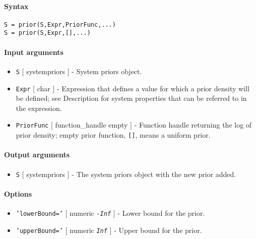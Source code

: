 


	\paragraph{Syntax}

\begin{verbatim}
S = prior(S,Expr,PriorFunc,...)
S = prior(S,Expr,[],...)
\end{verbatim}

\paragraph{Input arguments}

\begin{itemize}
\item
  \texttt{S} {[} systempriors {]} - System priors object.
\item
  \texttt{Expr} {[} char {]} - Expression that defines a value for which
  a prior density will be defined; see Description for system properties
  that can be referred to in the expression.
\item
  \texttt{PriorFunc} {[} function\_handle \textbar{} empty {]} -
  Function handle returning the log of prior density; empty prior
  function, \texttt{{[}{]}}, means a uniform prior.
\end{itemize}

\paragraph{Output arguments}

\begin{itemize}
\itemsep1pt\parskip0pt
\item
  \texttt{S} {[} systempriors {]} - The system priors object with the
  new prior added.
\end{itemize}

\paragraph{Options}

\begin{itemize}
\item
  \texttt{'lowerBound='} {[} numeric \textbar{} \emph{\texttt{-Inf}} {]}
  - Lower bound for the prior.
\item
  \texttt{'upperBound='} {[} numeric \textbar{} \emph{\texttt{Inf}} {]}
  - Upper bound for the prior.
\end{itemize}

